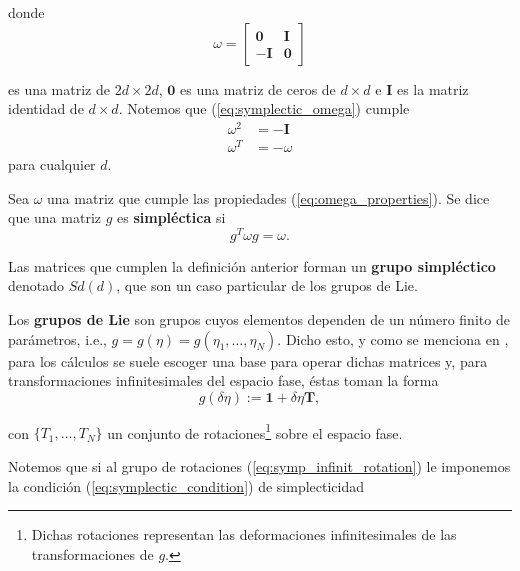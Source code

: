 donde
\begin{equation}
 \omega = 
    \begin{bmatrix}
    \mathbf{0} & \mathbf{I} \\
    -\mathbf{I} & \mathbf{0}
  \end{bmatrix}
 \label{eq:symplectic_omega}
\end{equation}

es una matriz de $2d\times 2d$, $\mathbf{0}$ es una matriz de ceros de $d\times d$ e $\mathbf{I}$ es la matriz identidad de $d\times d$. Notemos que (\ref{eq:symplectic_omega}) cumple
\begin{align}
 \omega^2 &= -\mathbf{I}  \nonumber \\
 \omega^T &= -\omega
 \label{eq:omega_properties}
\end{align}
para cualquier $d$.

\begin{definicion}
Sea $\omega$ una matriz que cumple las propiedades (\ref{eq:omega_properties}). Se dice que una matriz $g$ es \textbf{simpléctica} si
\begin{equation}
 g^T \omega g = \omega.
 \label{eq:symplectic_condition}
\end{equation}
\end{definicion}

Las matrices que cumplen la definición anterior forman un \textbf{grupo simpléctico} denotado $Sd(d)$, que son un caso particular de los grupos de Lie.

Los \textbf{grupos de Lie} son grupos cuyos elementos dependen de un número finito de parámetros, i.e., $g = g(\eta) = g(\eta_1,\ldots,\eta_N)$. Dicho esto, y como se menciona en \cite{CBHamiltonianDynamics}, para los cálculos se suele escoger una base para operar dichas matrices y, para transformaciones infinitesimales del espacio fase, éstas toman la forma
\begin{equation}
 g(\delta \eta) := \mathbf{1} + \delta \eta \mathbf{T},
 \label{eq:symp_infinit_rotation}
\end{equation}

con $\lbrace T_1, \ldots, T_N \rbrace$ un conjunto de rotaciones\footnote{Dichas rotaciones representan las deformaciones infinitesimales de las transformaciones de $g$.} sobre el espacio fase.

Notemos que si al grupo de rotaciones (\ref{eq:symp_infinit_rotation}) le imponemos la condición (\ref{eq:symplectic_condition}) de simplecticidad

